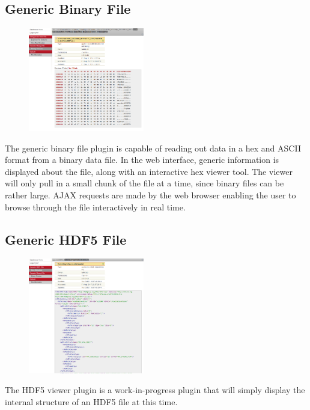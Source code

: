 \documentclass[10pt]{article}
\begin{document}
\subsection{Generic Binary File}
\begin{figure}
		\includegraphics[width=0.45\textwidth]{Generic_Binary_File.png}
\end{figure}
The generic binary file plugin is capable of reading out data in a hex and ASCII format from a binary data file.  In the web interface, generic information is displayed about the file, along with an interactive hex viewer tool.  The viewer will only pull in a small chunk of the file at a time, since binary files can be rather large.  AJAX requests are made by the web browser enabling the user to browse through the file interactively in real time.

\endgroup

\clearpage
\begingroup
\setlength\intextsep{0pt}
\subsection{Generic HDF5 File}
\begin{figure}
		\includegraphics[width=0.45\textwidth]{Generic_HDF5_File.png}
\end{figure}
The HDF5 viewer plugin is a work-in-progress plugin that will simply display the internal structure of an HDF5 file at this time.
\end{document}
